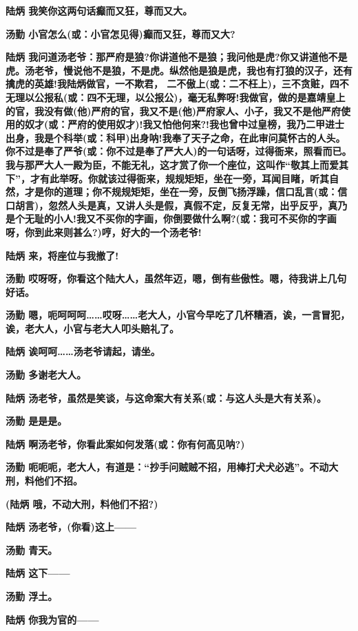 \textbf{陆炳 我笑你这两句话癫而又狂，尊而又大。}

\textbf{汤勤 小官怎么(或：小官怎见得)癫而又狂，尊而又大?}

\textbf{陆炳
我问道汤老爷：那严府是狼?你讲道他不是狼；我问他是虎?你又讲道他不是虎。汤老爷，慢说他不是狼，不是虎。纵然他是狼是虎，我也有打狼的汉子，还有擒虎的英雄!我陆炳做官，一不欺君，
二不傲上(或：二不枉上)，三不贪赃，四不无理以公报私(或：四不无理，以公报公)，毫无私弊呀!我做官，做的是嘉靖皇上的官，我没有做(他)严府的官，我又不是(他)严府家人、小子，我又不是他严府使用的奴才(或：严府的使用奴才)!我又怕他何来?!我也曾中过皇榜，我乃二甲进士出身，我是个科举(或：科甲)出身呐!我奉了天子之命，在此审问莫怀古的人头。你不过是奉了严爷(或：你不过是奉了严大人)的一句话呀，过得衙来，照看而已。我与那严大人一殿为臣，不能无礼，这才赏了你一个座位，这叫作``敬其上而爱其下''，才有此举呀。你就该过得衙来，规规矩矩，坐在一旁，耳闻目睹，听其自然，才是你的道理；你不规规矩矩，坐在一旁，反倒飞扬浮躁，信口乱言(或：信口胡言)，忽然人头是真，又讲人头是假，真假不定，反复无常，出乎反乎，真乃是个无耻的小人!我又不买你的字画，你倒要做什么啊?(或：我可不买你的字画呀，你到此来则甚么?)哼，好大的一个汤老爷!}

\textbf{陆炳 来，将座位与我撤了!}

\textbf{汤勤
哎呀呀，你看这个陆大人，虽然年迈，嗯，倒有些傲性。嗯，待我讲上几句好话。}

\textbf{汤勤
嗯，呃呵呵呵\ldots{}\ldots{}哎呀\ldots{}\ldots{}老大人，小官今早吃了几杯糟酒，诶，一言冒犯，诶，老大人，小官与老大人叩头赔礼了。}

\textbf{陆炳 诶呵呵\ldots{}\ldots{}汤老爷请起，请坐。}

\textbf{汤勤 多谢老大人。}

\textbf{陆炳
汤老爷，虽然是笑谈，与这命案大有关系(或：与这人头是大有关系)。}

\textbf{汤勤 是是是。}

\textbf{陆炳 啊汤老爷，你看此案如何发落(或：你有何高见呐?)}

\textbf{汤勤
呃呃呃，老大人，有道是：``抄手问贼贼不招，用棒打犬犬必逃''。不动大刑，料他们不招。}

\textbf{(陆炳 哦，不动大刑，料他们不招?)}

\textbf{陆炳 汤老爷，(你看)这上------}

\textbf{汤勤 青天。}

\textbf{陆炳 这下------}

\textbf{汤勤 浮土。}

\textbf{陆炳 你我为官的------}

